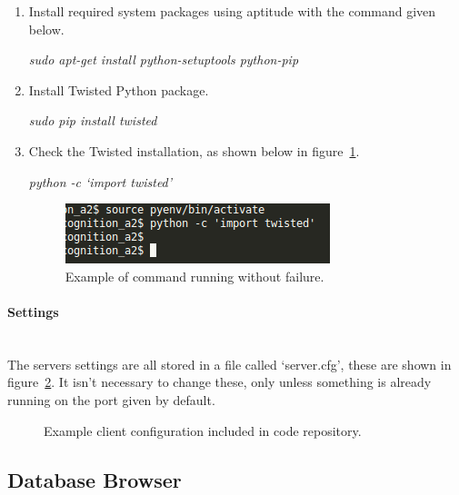 \documentclass[a4paper]{article}
\begin{document}
        \begin{enumerate}
            \item Install required system packages using aptitude with the command given below.

            \textit{sudo apt-get install python-setuptools python-pip}

            \item Install Twisted Python package.

            \textit{sudo pip install twisted}

            \item Check the Twisted installation, as shown below in figure~\ref{fig:twistedcheck}.

            \textit{python -c `import twisted'}
            \begin{figure}[H]
                \centering
                \caption{Example of command running without failure.}
                \label{fig:twistedcheck}
                    \includegraphics[scale=0.6]{../shared_assets/screenshots/manual/pychecktwisted.png}
            \end{figure}
        \end{enumerate}

        \paragraph{Settings}\mbox{}\\
        The servers settings are all stored in a file called `server.cfg', these are shown in figure~\ref{lst:servercfg}. It isn't
        necessary to change these, only unless something is already running on the port given by default.

        \begin{figure}[H]
            \centering
            \caption{Example client configuration included in code repository.}
            \label{lst:servercfg}
                
        \end{figure}

    \subsection{Database Browser}
\end{document}
